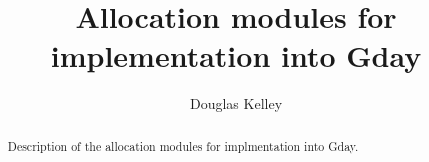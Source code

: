 \documentclass[]{report}
\title{Allocation modules for implementation into Gday}
\author{Douglas Kelley}
\begin{document}
\maketitle
\begin{abstract}
Description of the allocation modules for implmentation into Gday.
\end{abstract}

\gitAbbrevHash
\gitAuthorName
\gitAuthorEmail
\gitAuthorIsoDate 
\gitReferences

\tableofcontents


\end{document}
